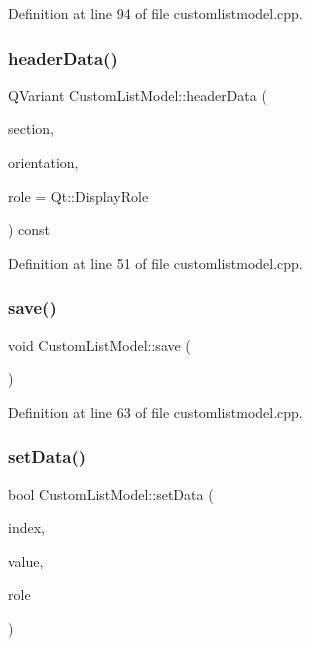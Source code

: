 Definition at line 94 of file customlistmodel.\+cpp.

\mbox{\label{classCustomListModel_a45f33d5c10dccef9c24839279f70b127}} 
\subsubsection{\texorpdfstring{header\+Data()}{headerData()}}
{\footnotesize\ttfamily Q\+Variant Custom\+List\+Model\+::header\+Data (\begin{DoxyParamCaption}\item[{int}]{section,  }\item[{Qt\+::\+Orientation}]{orientation,  }\item[{int}]{role = {\ttfamily Qt\+:\+:DisplayRole} }\end{DoxyParamCaption}) const}



Definition at line 51 of file customlistmodel.\+cpp.

\mbox{\label{classCustomListModel_a6ff097740cb1ff5e352c808b0c3133ee}} 
\subsubsection{\texorpdfstring{save()}{save()}}
{\footnotesize\ttfamily void Custom\+List\+Model\+::save (\begin{DoxyParamCaption}{ }\end{DoxyParamCaption})}



Definition at line 63 of file customlistmodel.\+cpp.

\mbox{\label{classCustomListModel_a73b3a21fae7ecd4119d82b5fd666ab90}} 
\subsubsection{\texorpdfstring{set\+Data()}{setData()}}
{\footnotesize\ttfamily bool Custom\+List\+Model\+::set\+Data (\begin{DoxyParamCaption}\item[{const Q\+Model\+Index \&}]{index,  }\item[{const Q\+Variant \&}]{value,  }\item[{int}]{role }\end{DoxyParamCaption})}



